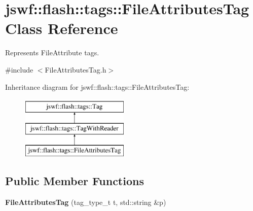 \hypertarget{classjswf_1_1flash_1_1tags_1_1_file_attributes_tag}{\section{jswf\+:\+:flash\+:\+:tags\+:\+:File\+Attributes\+Tag Class Reference}
\label{classjswf_1_1flash_1_1tags_1_1_file_attributes_tag}
}


Represents {\ttfamily File\+Attribute} tags.  




{\ttfamily \#include $<$File\+Attributes\+Tag.\+h$>$}

Inheritance diagram for jswf\+:\+:flash\+:\+:tags\+:\+:File\+Attributes\+Tag\+:\begin{figure}[H]
\begin{center}
\leavevmode
\includegraphics[height=3.000000cm]{classjswf_1_1flash_1_1tags_1_1_file_attributes_tag}
\end{center}
\end{figure}
\subsection*{Public Member Functions}
\begin{DoxyCompactItemize}
\item 
\hypertarget{classjswf_1_1flash_1_1tags_1_1_file_attributes_tag_a467831c52a097d2ed1dbd1dbf723624a}{{\bfseries File\+Attributes\+Tag} (tag\+\_\+type\+\_\+t t, std\+::string \&p)}\label{classjswf_1_1flash_1_1tags_1_1_file_attributes_tag_a467831c52a097d2ed1dbd1dbf723624a}

\end{DoxyCompactItemize}
